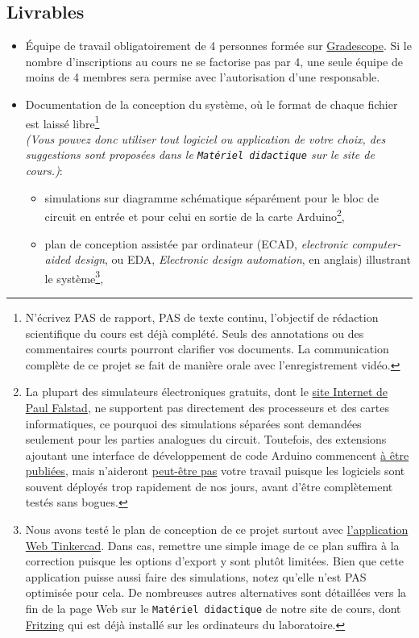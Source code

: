 \documentclass[english,french,12pt]{article}
\begin{document}
\subsection*{Livrables}
\label{subsec:livrables}
\vspace{-2ex}
\begin{itemize}
    \item Équipe de travail obligatoirement de 4 personnes formée sur \href{https://www.gradescope.com/}{Gradescope}. Si le nombre d'inscriptions au cours ne se factorise pas par 4, une seule équipe de moins de 4 membres sera permise avec l'autorisation d'une responsable.
    \item Documentation de la conception du système, où le format de chaque fichier est laissé libre\footnote{N'écrivez PAS de rapport, PAS de texte continu, l'objectif de rédaction scientifique du cours est déjà complété. Seuls des annotations ou des commentaires courts pourront clarifier vos documents. La communication complète de ce projet se fait de manière orale avec l'enregistrement vidéo.}\\ \textit{(Vous pouvez donc utiliser tout logiciel ou application de votre choix, des suggestions sont proposées dans le \texttt{Matériel didactique} sur le site de cours.)}:
    \begin{itemize}[label=$\bullet$]
        \item simulations sur diagramme schématique séparément pour le bloc de circuit en entrée et pour celui en sortie de la carte Arduino\footnote{La plupart des simulateurs électroniques gratuits, dont le \href{https://www.falstad.com/circuit/}{site Internet de Paul Falstad}, ne supportent pas directement des processeurs et des cartes informatiques, ce pourquoi des simulations séparées sont demandées seulement pour les parties analogues du circuit. Toutefois, des extensions ajoutant une interface de développement de code Arduino commencent \href{http://falstad.com/circuit/avr8js/}{à être publiées}, mais n'aideront \href{https://hackaday.com/2021/06/11/circuit-vr-arduino-virtually-meets-analog/}{peut-être pas} votre travail puisque les logiciels sont souvent déployés trop rapidement de nos jours, avant d'être complètement testés sans bogues.},
        \item plan de conception assistée par ordinateur (ECAD, \textit{electronic computer-aided design}, ou EDA, \textit{Electronic design automation}, en anglais) illustrant le système\footnote{Nous avons testé le plan de conception de ce projet surtout avec \href{https://www.tinkercad.com/login}{l'application Web Tinkercad}. Dans cas, remettre une simple image de ce plan suffira à la correction puisque les options d'export y sont plutôt limitées. Bien que cette application puisse aussi faire des simulations, notez qu'elle n'est PAS optimisée pour cela. De nombreuses autres alternatives sont détaillées vers la fin de la page Web sur le \texttt{Matériel didactique} de notre site de cours, dont \href{https://fritzing.org/}{Fritzing} qui est déjà installé sur les ordinateurs du laboratoire.},

\end{itemize}
\end{itemize}
\end{document}
